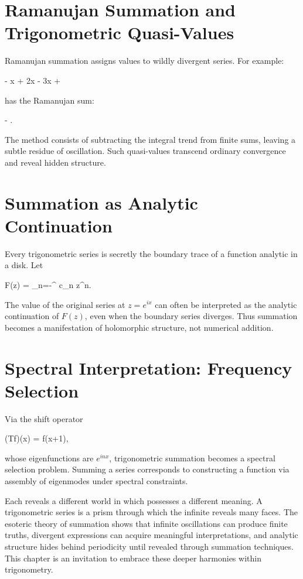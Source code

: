 \section{Ramanujan Summation and Trigonometric Quasi-Values}

Ramanujan summation assigns values to wildly divergent series. For example:

 - \cos x + \cos 2x - \cos 3x + \cdots
\stopformula

has the Ramanujan sum:

\startformula
{} - \cot{}.
\stopformula

The method consists of subtracting the integral trend from finite sums,
leaving a subtle residue of oscillation. Such quasi-values transcend
ordinary convergence and reveal hidden structure.

\section{Summation as Analytic Continuation}

Every trigonometric series is secretly the boundary trace of a function
analytic in a disk. Let

\startformula
F(z) = \sum_{n=-\infty}^{\infty} c_n z^n.
\stopformula

The value of the original series at $z=e^{ix}$ can often be interpreted
as the analytic continuation of $F(z)$, even when the boundary series
diverges. Thus summation becomes a manifestation of holomorphic structure,
not numerical addition.

\section{Spectral Interpretation: Frequency Selection}

Via the shift operator

\startformula
(Tf)(x) = f(x+1),
\stopformula

whose eigenfunctions are $e^{inx}$, trigonometric summation becomes
a spectral selection problem. Summing a series corresponds to constructing
a function via assembly of eigenmodes under spectral constraints.


Each reveals a different world in which  possesses a
different meaning. A trigonometric series is a prism through which the
infinite reveals many faces.
The esoteric theory of summation shows that infinite oscillations can
produce finite truths, divergent expressions can acquire meaningful
interpretations, and analytic structure hides behind periodicity until
revealed through summation techniques. This chapter is an invitation to
embrace these deeper harmonies within trigonometry.

